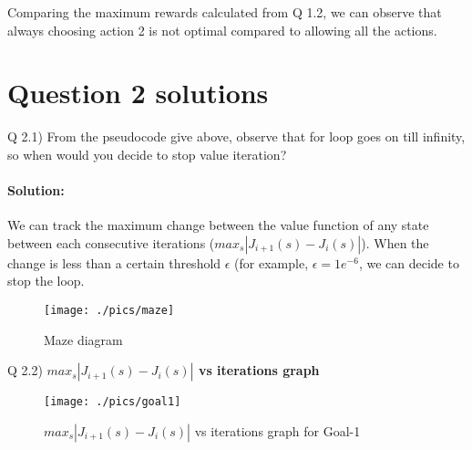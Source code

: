 \documentclass{article}
\begin{document}
Comparing the maximum rewards calculated from Q 1.2, we can observe that always choosing action 2 is not optimal compared to allowing all the actions.



\clearpage
\section*{Question 2 solutions}

Q 2.1) From the pseudocode give above, observe that for loop goes on till infinity, so when would you decide to stop value iteration?

\paragraph{Solution: } We can track the maximum change between the value function of any state between each consecutive iterations ($max_s |J_{i+1}(s) - J_i(s)|$). When the change is less than a certain threshold $\epsilon$ (for example, $\epsilon = 1e^{-6}$, we can decide to stop the loop.

\begin{figure}[!htb]
    \centering
    \texttt{[image: ./pics/maze]}
    \caption{Maze diagram}
    \label{fig:maze}
\end{figure}

\clearpage
Q 2.2) \textbf{$max_s |J_{i+1}(s) - J_i(s)|$ vs iterations graph}

\begin{figure}[!htb]
    \centering
    \texttt{[image: ./pics/goal1]}
    \label{fig:maze}
    \caption{$max_s |J_{i+1}(s) - J_i(s)|$ vs iterations graph for Goal-1}
\end{figure}
\end{document}
